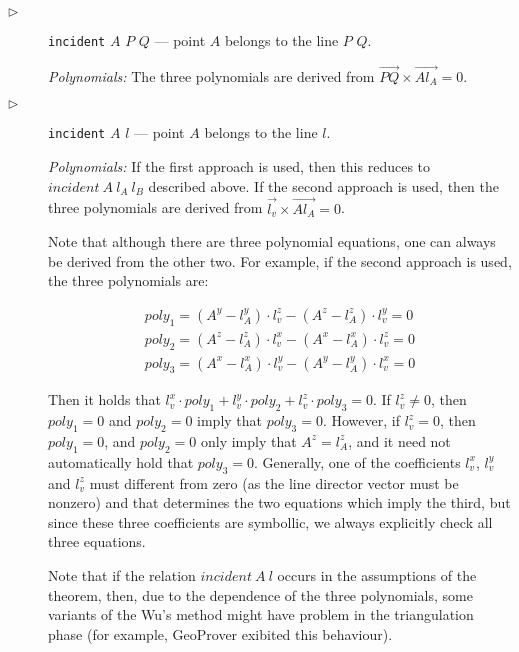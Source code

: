 \documentclass[final,1p,times,authoryear]{elsarticle}
\begin{document}
\begin{description}
\item[$\triangleright$] {\tt incident} $A$ $P$ $Q$ --- point $A$ belongs
  to the line $P$ $Q$.

{\em Polynomials:} The three polynomials are derived from
$\overrightarrow{PQ} \times \overrightarrow{Al_A} = 0$.

\item[$\triangleright$] {\tt incident} $A$ $l$ --- point $A$ belongs
  to the line $l$.

{\em Polynomials:} If the first approach is used, then this reduces to
$incident\ A\ l_A\ l_B$ described above. If the second approach is
used, then the three polynomials are derived from
$\overrightarrow{l_v} \times \overrightarrow{Al_A} = 0$.

 Note that although
there are three polynomial equations, one can always be derived from
the other two. For example, if the second approach is used, the three
polynomials are:

\begin{eqnarray*}
  poly_1 = (A^y - l_A^y)\cdot l_v^z - (A^z - l_A^z)\cdot l_v^y = 0\\
  poly_2 = (A^z - l_A^z)\cdot l_v^x - (A^x - l_A^x)\cdot l_v^z = 0\\
  poly_3 = (A^x - l_A^x)\cdot l_v^y - (A^y - l_A^y)\cdot l_v^x = 0
\end{eqnarray*}

Then it holds that $l_v^x \cdot poly_1 + l_v^y \cdot poly_2 + l_v^z
\cdot poly_3 = 0$. If $l_v^z \neq 0$, then $poly_1 = 0$ and $poly_2 =
0$ imply that $poly_3 = 0$. However, if $l_v^z = 0$, then $poly_1 =
0$, and $poly_2 = 0$ only imply that $A^z = l_A^z$, and it need not
automatically hold that $poly_3 = 0$. Generally, one of the
coefficients $l_v^x$, $l_v^y$ and $l_v^z$ must different from zero (as
the line director vector must be nonzero) and that determines the two
equations which imply the third, but since these three coefficients
are symbollic, we always explicitly check all three equations.

Note that if the relation $incident\ A\ l$ occurs in the assumptions
of the theorem, then, due to the dependence of the three polynomials,
some variants of the Wu's method might have problem in the
triangulation phase (for example, GeoProver exibited this behaviour).


\end{description}
\end{document}
